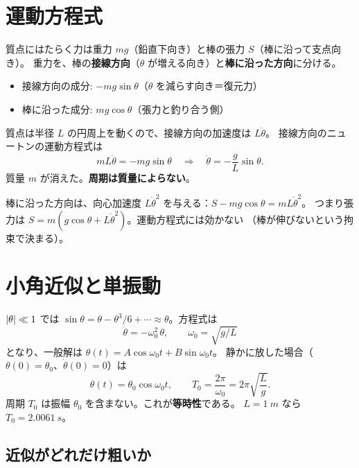\section{運動方程式}\label{sec:pend-eom}

質点にはたらく力は重力 $mg$（鉛直下向き）と棒の張力 $S$（棒に沿って支点向き）。
重力を、棒の\textbf{接線方向}（$\theta$ が増える向き）と\textbf{棒に沿った方向}に分ける。
\begin{itemize}
  \item 接線方向の成分: $-mg\sin\theta$（$\theta$ を減らす向き＝復元力）
  \item 棒に沿った成分: $mg\cos\theta$（張力と釣り合う側）
\end{itemize}
質点は半径 $L$ の円周上を動くので、接線方向の加速度は $L\ddot\theta$。
接線方向のニュートンの運動方程式は
\begin{equation}
  mL\ddot\theta=-mg\sin\theta
  \quad\Longrightarrow\quad
  \boxed{\ddot\theta=-\frac gL\sin\theta}.
  \label{eq:pend-eom}
\end{equation}
質量 $m$ が消えた。\textbf{周期は質量によらない}。

棒に沿った方向は、向心加速度 $L\dot\theta^2$ を与える：$S-mg\cos\theta=mL\dot\theta^2$。
つまり張力は $S=m(g\cos\theta+L\dot\theta^2)$。運動方程式には効かない
（棒が伸びないという拘束で決まる）。

\section{小角近似と単振動}\label{sec:pend-small}

$\left\lvert \theta\right\rvert\ll1$ では $\sin\theta=\theta-\theta^3/6+\cdots\approx\theta$。方程式は
\begin{equation}
  \ddot\theta=-\omega_0^2\,\theta,\qquad \omega_0=\sqrt{g/L}
  \label{eq:pend-small}
\end{equation}
となり、一般解は $\theta(t)=A\cos\omega_0t+B\sin\omega_0t$。
静かに放した場合（$\theta(0)=\theta_0$、$\dot\theta(0)=0$）は
\begin{equation}
  \theta(t)=\theta_0\cos\omega_0t,\qquad T_0=\frac{2\pi}{\omega_0}=2\pi\sqrt{\frac Lg}.
\end{equation}
周期 $T_0$ は振幅 $\theta_0$ を含まない。これが\textbf{等時性}である。
$L=\qty{1}{m}$ なら $T_0=\qty{2.0061}{s}$。

\subsection*{近似がどれだけ粗いか}

